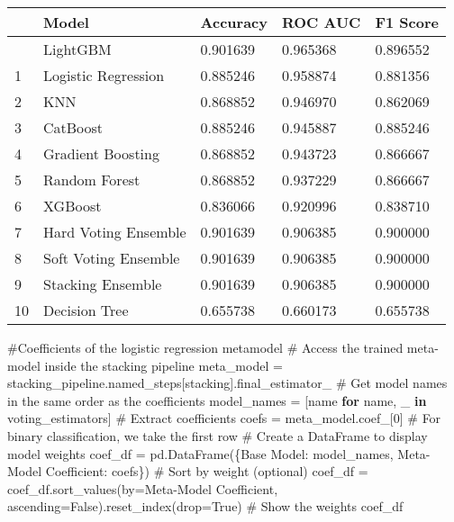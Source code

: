 \documentclass[
  letterpaper,
  DIV=11,
  numbers=noendperiod]{scrreprt}
\newenvironment{Shaded}{\begin{snugshade}}{\end{snugshade}}
\newcommand{\CommentTok}[1]{\textcolor[rgb]{0.37,0.37,0.37}{#1}}
\newcommand{\ControlFlowTok}[1]{\textcolor[rgb]{0.00,0.23,0.31}{\textbf{#1}}}
\newcommand{\DecValTok}[1]{\textcolor[rgb]{0.68,0.00,0.00}{#1}}
\newcommand{\KeywordTok}[1]{\textcolor[rgb]{0.00,0.23,0.31}{\textbf{#1}}}
\newcommand{\NormalTok}[1]{\textcolor[rgb]{0.00,0.23,0.31}{#1}}
\newcommand{\OperatorTok}[1]{\textcolor[rgb]{0.37,0.37,0.37}{#1}}
\newcommand{\StringTok}[1]{\textcolor[rgb]{0.13,0.47,0.30}{#1}}
\newcommand{\VariableTok}[1]{\textcolor[rgb]{0.07,0.07,0.07}{#1}}
\begin{document}
\begin{longtable}[]{@{}lllll@{}}
\toprule\noalign{}
& Model & Accuracy & ROC AUC & F1 Score \\
\midrule\noalign{}
\endhead
\bottomrule\noalign{}
\endlastfoot
0 & LightGBM & 0.901639 & 0.965368 & 0.896552 \\
1 & Logistic Regression & 0.885246 & 0.958874 & 0.881356 \\
2 & KNN & 0.868852 & 0.946970 & 0.862069 \\
3 & CatBoost & 0.885246 & 0.945887 & 0.885246 \\
4 & Gradient Boosting & 0.868852 & 0.943723 & 0.866667 \\
5 & Random Forest & 0.868852 & 0.937229 & 0.866667 \\
6 & XGBoost & 0.836066 & 0.920996 & 0.838710 \\
7 & Hard Voting Ensemble & 0.901639 & 0.906385 & 0.900000 \\
8 & Soft Voting Ensemble & 0.901639 & 0.906385 & 0.900000 \\
9 & Stacking Ensemble & 0.901639 & 0.906385 & 0.900000 \\
10 & Decision Tree & 0.655738 & 0.660173 & 0.655738 \\
\end{longtable}

\begin{Shaded}
\begin{Highlighting}[]
\CommentTok{\#Coefficients of the logistic regression metamodel}
\CommentTok{\# Access the trained meta{-}model inside the stacking pipeline}
\NormalTok{meta\_model }\OperatorTok{=}\NormalTok{ stacking\_pipeline.named\_steps[}\StringTok{\textquotesingle{}stacking\textquotesingle{}}\NormalTok{].final\_estimator\_}
\CommentTok{\# Get model names in the same order as the coefficients}
\NormalTok{model\_names }\OperatorTok{=}\NormalTok{ [name }\ControlFlowTok{for}\NormalTok{ name, \_ }\KeywordTok{in}\NormalTok{ voting\_estimators]}
\CommentTok{\# Extract coefficients}
\NormalTok{coefs }\OperatorTok{=}\NormalTok{ meta\_model.coef\_[}\DecValTok{0}\NormalTok{]  }\CommentTok{\# For binary classification, we take the first row}
\CommentTok{\# Create a DataFrame to display model weights}
\NormalTok{coef\_df }\OperatorTok{=}\NormalTok{ pd.DataFrame(\{}\StringTok{\textquotesingle{}Base Model\textquotesingle{}}\NormalTok{: model\_names, }\StringTok{\textquotesingle{}Meta{-}Model Coefficient\textquotesingle{}}\NormalTok{: coefs\})}
\CommentTok{\# Sort by weight (optional)}
\NormalTok{coef\_df }\OperatorTok{=}\NormalTok{ coef\_df.sort\_values(by}\OperatorTok{=}\StringTok{\textquotesingle{}Meta{-}Model Coefficient\textquotesingle{}}\NormalTok{, ascending}\OperatorTok{=}\VariableTok{False}\NormalTok{).reset\_index(drop}\OperatorTok{=}\VariableTok{True}\NormalTok{)}
\CommentTok{\# Show the weights}
\NormalTok{coef\_df}
\end{Highlighting}
\end{Shaded}
\end{document}
